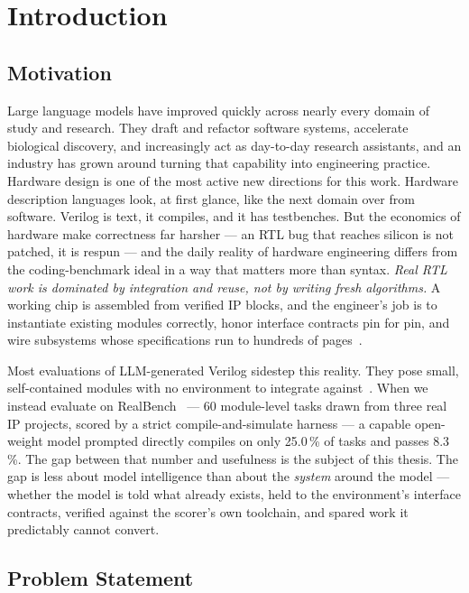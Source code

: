 
\chapter{Introduction}
\label{ch:01}

\section{Motivation}
\label{sec:intro-motivation}

Large language models have improved quickly across nearly every domain
of study and research. They draft and refactor software systems,
accelerate biological discovery, and increasingly act as day-to-day
research assistants, and an industry has grown around turning that
capability into engineering practice. Hardware design is one of the
most active new directions for this work. Hardware description
languages look, at first glance, like the next domain over from
software. Verilog is text, it compiles, and it has testbenches. But
the economics of hardware make correctness far harsher --- an RTL bug
that reaches silicon is not patched, it is respun --- and the daily
reality of hardware engineering differs from the coding-benchmark
ideal in a way that matters more than syntax. \emph{Real RTL work is
dominated by integration and reuse, not by writing fresh algorithms.}
A working chip is assembled from verified IP blocks, and the
engineer's job is to instantiate existing modules correctly, honor
interface contracts pin for pin, and wire subsystems whose
specifications run to hundreds of pages~\citep{keating2002reuse}.

Most evaluations of LLM-generated Verilog sidestep this reality. They
pose small, self-contained modules with no environment to integrate
against~\citep{liu2023verilogeval, lu2024rtllm}. When we instead evaluate
on RealBench~\citep{realbench2025} --- 60 module-level tasks drawn from
three real IP projects, scored by a strict compile-and-simulate harness
--- a capable open-weight model prompted directly compiles on only
25.0\,\% of tasks and passes 8.3\,\%. The gap between that number and
usefulness is the subject of this thesis. The gap is less about model
intelligence than about the \emph{system} around the model --- whether
the model is told what already exists, held to the environment's
interface contracts, verified against the scorer's own toolchain, and
spared work it predictably cannot convert.

\section{Problem Statement}
\label{sec:intro-problem}

